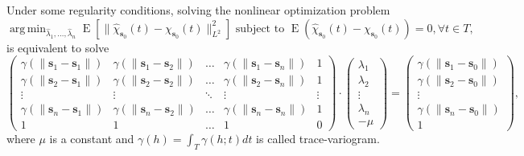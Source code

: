 \documentclass[12pt,]{article}
\DeclareMathOperator{\espe}{E}
\DeclareMathOperator*{\argmin}{arg\,min}
\theoremstyle{definition}
\theoremstyle{definition}
\theoremstyle{definition}
\theoremstyle{remark}
\let\BeginKnitrBlock\begin \let\EndKnitrBlock\end
\begin{document}
\BeginKnitrBlock{theorem}
\protect\hypertarget{thm:sistLinear}{}{\label{thm:sistLinear} }Under some regularity conditions, solving the nonlinear optimization problem
\begin{equation*}
    \argmin_{\hat{\lambda}_1, \dots, \hat{\lambda}_{n}} \espe \left[ \lVert\hat{\chi}_{\bm{s}_0}(t) - \chi_{\bm{s}_0}(t) \rVert_{L^2}^2\right] \mbox{ subject to }\espe(\hat{\chi}_{\bm{s}_0}(t) - \chi_{\bm{s}_0}(t)) =0, \forall t \in T,
    \end{equation*}
is equivalent to solve
\begin{equation*}
    \begin{pmatrix}
    \gamma(\lVert\bm{s}_1 - \bm{s}_1\rVert) & \gamma(\lVert\bm{s}_1 - \bm{s}_2\rVert) & \dots & \gamma(\lVert\bm{s}_{1} - \bm{s}_n\rVert) & 1\\
    \gamma(\lVert\bm{s}_2 - \bm{s}_1\rVert) & \gamma(\lVert\bm{s}_2 - \bm{s}_2\rVert) & \dots & \gamma(\lVert\bm{s}_{2} - \bm{s}_n\rVert) & 1\\
    \vdots & \vdots & \ddots & \vdots &\vdots\\
    \gamma(\lVert\bm{s}_{n} - \bm{s}_1\rVert) & \gamma(\lVert\bm{s}_{n} - \bm{s}_2\rVert) & \dots & \gamma(\lVert\bm{s}_{n} - \bm{s}_{n}\rVert) & 1\\
    1 & 1 & \dots & 1 & 0
    \end{pmatrix}
    \cdot
    \begin{pmatrix}
    \lambda_1\\
    \lambda_2\\
    \vdots\\
    \lambda_{n}\\
    -\mu
    \end{pmatrix}
    =
    \begin{pmatrix}
    \gamma(\lVert\bm{s}_1 - \bm{s}_0\rVert)\\
    \gamma(\lVert\bm{s}_2 - \bm{s}_0\rVert)\\
    \vdots\\
    \gamma(\lVert\bm{s}_{n}- \bm{s}_0\rVert)\\
    1
    \end{pmatrix},
    \end{equation*}
where \(\mu\) is a constant and \(\gamma(h) = \int_T \gamma(h;t)dt\) is called trace-variogram.
\EndKnitrBlock{theorem}
\end{document}
